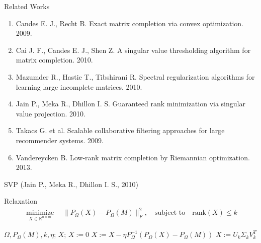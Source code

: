 \documentclass{beamer}
\begin{document}
\begin{frame}{Related Works}
\begin{enumerate}
	\item Candes E. J., Recht B. Exact matrix completion via convex optimization. 2009.
	\item Cai J. F., Candes E. J., Shen Z. A singular value thresholding algorithm for matrix completion. 2010.
	\item Mazumder R., Hastie T., Tibshirani R. Spectral regularization algorithms for learning large incomplete matrices. 2010.
	\item Jain P., Meka R., Dhillon I. S. Guaranteed rank minimization via singular value projection. 2010.
	\item Takacs G. et al. Scalable collaborative filtering approaches for large recommender systems. 2009.
	\item Vandereycken B. Low-rank matrix completion by Riemannian optimization. 2013.
\end{enumerate}
\end{frame}
\begin{frame}{SVP (Jain P., Meka R., Dhillon I. S., 2010)}

	\begin{block}{Relaxation}
		\vspace{-0.5cm}
		\begin{align*}
		\mathop{\text{minimize}}\limits_{X \in \mathbb{R}^{n \times m}} \quad 
		\| P_{\Omega} (X) - P_{\Omega} (M) \|_F^2, \quad
		\text{subject to} \quad \text{rank} (X) \leq k
		\end{align*}
	\end{block}
\vspace{0.3cm}
\begin{algorithmic}[1] 
	\REQUIRE $\Omega, P_\Omega(M), k, \eta$; 
	\ENSURE $X$;
	\STATE $X:= 0$
	\REPEAT
	\STATE $X := X - \eta P_{\Omega}^{-1}\left(P_{\Omega}(X) - P_{\Omega}(M)\right)$
	\STATE $X := U_k \Sigma_k V_k^T$
\end{algorithmic}
\end{frame}
\end{document}
